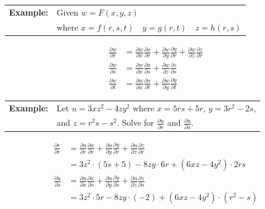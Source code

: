 \documentclass{article}
\begin{document}
\begin{enumerate}[start=1,label={\bfseries Theorem \arabic*:}, wide = 0pt]
\begin{tabular}{ll}
    \textbf{Example:} & Given $w = F(x, y, z)$ \\
    & where $x = f(r, s, t) \quad y = g(r, t) \quad z = h(r, s)$
\end{tabular}
\begin{align*}
    \frac{\partial w}{\partial r} &= \frac{\partial w}{\partial x} \frac{\partial x}{\partial r} + \frac{\partial w}{\partial y} \frac{\partial y}{\partial r} + \frac{\partial w}{\partial z} \frac{\partial z}{\partial r} \\
    \frac{\partial w}{\partial s} &= \frac{\partial w}{\partial x} \frac{\partial x}{\partial s} + \frac{\partial w}{\partial z} \frac{\partial z}{\partial s} \\
    \frac{\partial w}{\partial t} &= \frac{\partial w}{\partial x} \frac{\partial x}{\partial t} + \frac{\partial w}{\partial y} \frac{\partial y}{\partial t}
\end{align*}
\begin{tabular}{ll}
    \textbf{Example:} & Let $u = 3xz^2-4zy^2$ where $x=5rs + 5r$, $y=3r^2 - 2s$, \\
    & and $z = r^2s - s^2$. Solve for $\frac{\partial u}{\partial r}$ and $\frac{\partial u}{\partial s}$.
\end{tabular}

\begin{align*}
    \frac{\partial r}{\partial r} &= \frac{\partial u}{\partial r} \frac{\partial x}{\partial r} + \frac{\partial u}{\partial y} \frac{\partial y}{\partial r} + \frac{\partial u}{\partial z} \frac{\partial z}{\partial r} \\
    &= 3z^2 \cdot (5s+5) - 8zy \cdot 6r + (6xz - 4y^2) \cdot 2rs \\[1.5ex]
    \frac{\partial u}{\partial s} &= \frac{\partial u}{\partial x} \frac{\partial x}{\partial s} + \frac{\partial u}{\partial y} \frac{\partial y}{\partial s} + \frac{\partial u}{\partial z} \frac{\partial z}{\partial s} \\
    &= 3z^2 \cdot 5r - 8zy \cdot (-2) + (6xz -4y^2) \cdot (r^2 - s)
\end{align*}
\end{enumerate}
\end{document}
